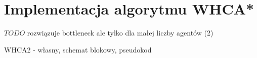 \section{Implementacja algorytmu WHCA*}
\label{ch:alg-whca}

$TODO$ rozwiązuje bottleneck ale tylko dla małej liczby agentów (2)

WHCA2 - własny, schemat blokowy, pseudokod